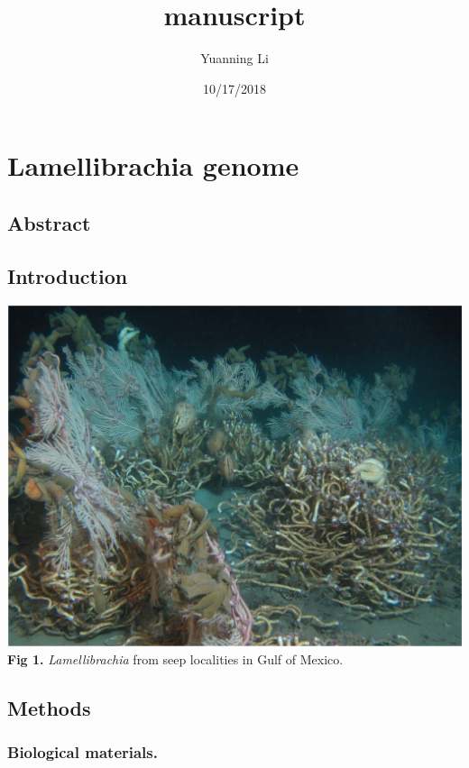 \documentclass[]{article}
\title{manuscript}
\author{Yuanning Li}
\date{10/17/2018}
\begin{document}
\maketitle

\hypertarget{lamellibrachia-genome}{%
\section{Lamellibrachia genome}\label{lamellibrachia-genome}}

\hypertarget{abstract}{%
\subsection{Abstract}\label{abstract}}

\hypertarget{introduction}{%
\subsection{Introduction}\label{introduction}}

\includegraphics{figures/Picture1.png} \textbf{Fig 1.}
\emph{Lamellibrachia} from seep localities in Gulf of Mexico.

\hypertarget{methods}{%
\subsection{Methods}\label{methods}}

\hypertarget{biological-materials.}{%
\subsubsection{Biological materials.}\label{biological-materials.}}
\end{document}
